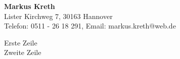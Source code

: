 \documentclass[a4paper,10pt]{scrartcl}
\begin{document}
\centering \textbf{Markus Kreth}\\Lister Kirchweg 7, 30163 Hannover\\Telefon: 0511 - 26 18 291, Email: markus.kreth@web.de

Erste Zeile\\
Zweite Zeile
\end{document}
